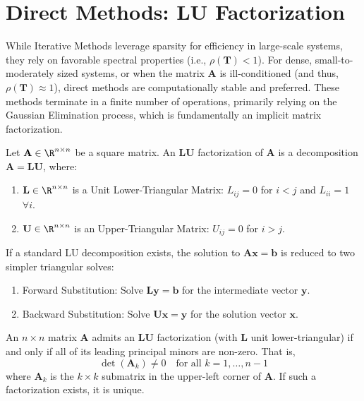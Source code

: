 \newpage
\section{Direct Methods: LU Factorization}

While Iterative Methods leverage sparsity for efficiency in large-scale systems, they rely on favorable spectral properties (i.e., $\rho(\mathbf{T}) < 1$). For dense, small-to-moderately sized systems, or when the matrix $\mathbf{A}$ is ill-conditioned (and thus, $\rho(\mathbf{T}) \approx 1$), direct methods are computationally stable and preferred. These methods terminate in a finite number of operations, primarily relying on the Gaussian Elimination process, which is fundamentally an implicit matrix factorization.

\begin{definition}[LU Factorization]
Let $\mathbf{A} \in \R^{n \times n}$ be a square matrix. An $\mathbf{LU}$ factorization of $\mathbf{A}$ is a decomposition $\mathbf{A} = \mathbf{L}\mathbf{U}$, where:
\begin{enumerate}
    \item $\mathbf{L} \in \R^{n \times n}$ is a Unit Lower-Triangular Matrix: $L_{ij} = 0$ for $i < j$ and $L_{ii} = 1$ $\forall i$.
    \item $\mathbf{U} \in \R^{n \times n}$ is an Upper-Triangular Matrix: $U_{ij} = 0$ for $i > j$.
\end{enumerate}
If a standard LU decomposition exists, the solution to $\mathbf{A}\mathbf{x} = \mathbf{b}$ is reduced to two simpler triangular solves:
\begin{enumerate}
    \item Forward Substitution: Solve $\mathbf{L}\mathbf{y} = \mathbf{b}$ for the intermediate vector $\mathbf{y}$.
    \item Backward Substitution: Solve $\mathbf{U}\mathbf{x} = \mathbf{y}$ for the solution vector $\mathbf{x}$.
\end{enumerate}
\end{definition}

\begin{theorem}
An $n \times n$ matrix $\mathbf{A}$ admits an $\mathbf{LU}$ factorization (with $\mathbf{L}$ unit lower-triangular) if and only if all of its leading principal minors are non-zero. That is,
\[ \det(\mathbf{A}_k) \ne 0 \quad \text{for all } k = 1, \dots, n-1 \]
where $\mathbf{A}_k$ is the $k \times k$ submatrix in the upper-left corner of $\mathbf{A}$.
If such a factorization exists, it is unique.
\end{theorem}

